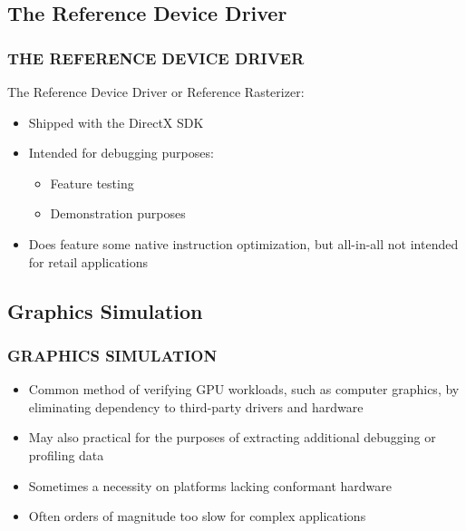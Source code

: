 \subsection{The Reference Device Driver}
\begin{frame}
\frametitle{THE REFERENCE DEVICE DRIVER}

The Reference Device Driver or Reference Rasterizer:
\begin{itemize}
\item Shipped with the DirectX SDK
\item Intended for debugging purposes:
  \begin{itemize}
  \item Feature testing
  \item Demonstration purposes
  \end{itemize}
\item Does feature some native instruction optimization, but all-in-all not intended for retail applications
\end{itemize}

\end{frame}

\subsection{Graphics Simulation}
\begin{frame}
\frametitle{GRAPHICS SIMULATION}

\begin{itemize}
\item Common method of verifying GPU workloads, such as computer graphics, by eliminating dependency to third-party drivers and hardware
\item May also practical for the purposes of extracting additional debugging or profiling data
\item Sometimes a necessity on platforms lacking conformant hardware
\item Often orders of magnitude too slow for complex applications
\end{itemize}

\end{frame}

